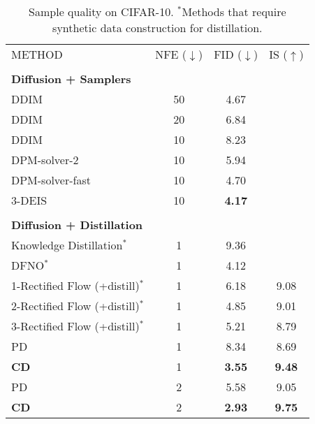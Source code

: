 \begin{table*}
    \begin{minipage}[t]{0.49\linewidth}
	\caption{Sample quality on CIFAR-10. $^\ast$Methods that require synthetic data construction for distillation.}\label{tab:results}
	\centering
	{\setlength{\extrarowheight}{1.5pt}
	\begin{adjustbox}{max width=\linewidth}
	\begin{tabular}{lccc}
        \Xhline{3\arrayrulewidth}
	    METHOD & NFE ($\downarrow$) & FID ($\downarrow$) & IS ($\uparrow$) \\
        \\[-2ex]
        \multicolumn{4}{l}{\textbf{Diffusion + Samplers}}\\\Xhline{3\arrayrulewidth}
        DDIM \cite{song2020denoising}
        & 50 & 4.67\\
        DDIM \cite{song2020denoising}
        & 20 & 6.84\\
        DDIM \cite{song2020denoising}
        & 10 & 8.23\\
        DPM-solver-2 \cite{lu2022dpm}
        & 10 & 5.94\\
        DPM-solver-fast \cite{lu2022dpm}
        & 10 & 4.70 \\
        3-DEIS \cite{zhang2022fast}
        & 10 & \textbf{4.17}\\
        \\[-2ex]
        \multicolumn{4}{l}{\textbf{Diffusion + Distillation}}\\\Xhline{3\arrayrulewidth}
        Knowledge Distillation$^\ast$ \cite{luhman2021knowledge}
         & 1 & 9.36 &  \\
        DFNO$^\ast$ \cite{zheng2022fast}
        & 1 & 4.12 & \\
        1-Rectified Flow (+distill)$^\ast$ \cite{liu2022flow}
         & 1 & 6.18 & 9.08\\
        2-Rectified Flow (+distill)$^\ast$ \cite{liu2022flow}
         & 1 & 4.85 & 9.01\\
        3-Rectified Flow (+distill)$^\ast$ \cite{liu2022flow}
         & 1 & 5.21 & 8.79\\
        PD \cite{salimans2022progressive} & 1 & 8.34 & 8.69 \\
        \textbf{CD} & 1 & \textbf{3.55} & \textbf{9.48} \\
        \hline
        PD \cite{salimans2022progressive}  & 2 & 5.58 & 9.05 \\
        \textbf{CD}  & 2 & \textbf{2.93} & \textbf{9.75} \\

\end{tabular}
\end{adjustbox}}
\end{minipage}
\end{table*}
